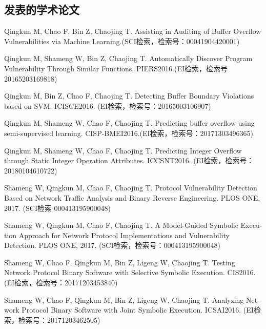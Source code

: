 \begin{resume}

  \section*{发表的学术论文} %
  \begin{enumerate}[{[}1{]}]
  \item Qingkun M, Chao F, Bin Z, Chaojing T. Assisting in Auditing of Buffer Overflow Vulnerabilities via Machine Learning.(SCI检索，检索号：00041904420001)
  
  \item Qingkun M, Shameng W, Bin Z, Chaojing T. Automatically Discover Program Vulnerability Through Similar Functions. PIERS2016.(EI检索，检索号20165203169818)
  
  \item Qingkun M, Bin Z, Chao F, Chaojing T. Detecting Buffer Boundary Violations based on SVM. ICISCE2016. (EI检索，检索号：20165003106907)
  
  \item Qingkun M, Shameng W, Chao F, Chaojing T. Predicting buffer overflow using semi-supervised learning. CISP-BMEI2016.(EI检索，检索号：20171303496365)
  
  \item Qingkun M, Shameng W, Chao F, Chaojing T. Predicting Integer Overflow through Static Integer Operation Attributes. ICCSNT2016. (EI检索，检索号：20180104610722)
  
  \item Shameng W, Qingkun M, Chao F, Chaojing T. Protocol Vulnerability Detection Based on Network Traffic Analysis and Binary Reverse Engineering. PLOS ONE, 2017. (SCI检索 000413195900048)
    
  \item Shameng W, Qingkun M, Chao F, Chaojing T. A Model-Guided Symbolic Execu-
  tion Approach for Network Protocol Implementations and Vulnerability Detection.
  PLOS ONE, 2017. (SCI检索，检索号：000413195900048)
  
  \item Shameng W, Chao F, Qingkun M, Bin Z, Ligeng W, Chaojing T. Testing Network
  Protocol Binary Software with Selective Symbolic Execution. CIS2016. (EI检索，检索号：20171203453840)
  
  \item Shameng W, Chao F, Qingkun M, Bin Z, Ligeng W, Chaojing T. Analyzing Net-
  work Protocol Binary Software with Joint Symbolic Execution. ICSAI2016. (EI检索，检索号：20171203462505)
  

\end{enumerate}
\end{resume}
